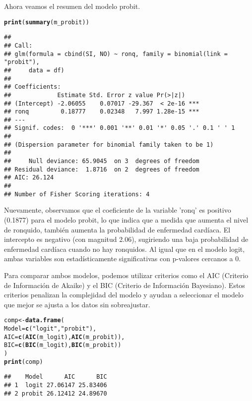 \documentclass[paper=letter, fontsize=11pt, draft=false]{scrartcl}\usepackage[]{graphicx}\usepackage[]{xcolor}
\makeatletter
\newcommand{\hlsng}[1]{\textcolor[rgb]{0.192,0.494,0.8}{#1}}%
\newcommand{\hldef}[1]{\textcolor[rgb]{0.345,0.345,0.345}{#1}}%
\newcommand{\hlkwb}[1]{\textcolor[rgb]{0.69,0.353,0.396}{#1}}%
\newcommand{\hlkwc}[1]{\textcolor[rgb]{0.333,0.667,0.333}{#1}}%
\newcommand{\hlkwd}[1]{\textcolor[rgb]{0.737,0.353,0.396}{\textbf{#1}}}%
\newenvironment{kframe}{%
 \def\at@end@of@kframe{}%
 \ifinner\ifhmode%
  \def\at@end@of@kframe{\end{minipage}}%
  \begin{minipage}{\columnwidth}%
 \fi\fi%
 \def\FrameCommand##1{\hskip\@totalleftmargin \hskip-\fboxsep
 \colorbox{shadecolor}{##1}\hskip-\fboxsep
     \hskip-\linewidth \hskip-\@totalleftmargin \hskip\columnwidth}%
 \MakeFramed {\advance\hsize-\width
   \@totalleftmargin\z@ \linewidth\hsize
   \@setminipage}}%
 {\par\unskip\endMakeFramed%
 \at@end@of@kframe}
\newenvironment{knitrout}{}{} %
\numberwithin{equation}{problemcounter} %
\numberwithin{figure}{problemcounter} %
\numberwithin{table}{problemcounter} %
\numberwithin{subsection}{problemcounter}
\makeatother
\begin{document}
Ahora veamos el resumen del modelo probit.

\begin{knitrout}
\color{fgcolor}\begin{kframe}
\begin{alltt}
\hlkwd{print}\hldef{(}\hlkwd{summary}\hldef{(m_probit))}
\end{alltt}
\begin{verbatim}
## 
## Call:
## glm(formula = cbind(SI, NO) ~ ronq, family = binomial(link = "probit"), 
##     data = df)
## 
## Coefficients:
##             Estimate Std. Error z value Pr(>|z|)    
## (Intercept) -2.06055    0.07017 -29.367  < 2e-16 ***
## ronq         0.18777    0.02348   7.997 1.28e-15 ***
## ---
## Signif. codes:  0 '***' 0.001 '**' 0.01 '*' 0.05 '.' 0.1 ' ' 1
## 
## (Dispersion parameter for binomial family taken to be 1)
## 
##     Null deviance: 65.9045  on 3  degrees of freedom
## Residual deviance:  1.8716  on 2  degrees of freedom
## AIC: 26.124
## 
## Number of Fisher Scoring iterations: 4
\end{verbatim}
\end{kframe}
\end{knitrout}

Nuevamente, observamos que el coeficiente de la variable 'ronq' es positivo (0.1877) para el modelo probit, lo que indica que a medida que aumenta el nivel de ronquido, también aumenta la probabilidad de enfermedad cardíaca. El intercepto es negativo (con magnitud 2.06), sugiriendo una baja probabilidad de enfermedad cardíaca cuando no hay ronquidos. Al igual que en el modelo logit, ambas variables son estadísticamente significativas con p-valores cercanos a 0. 

Para comparar ambos modelos, podemos utilizar criterios como el AIC (Criterio de Información de Akaike) y el BIC (Criterio de Información Bayesiano). Estos criterios penalizan la complejidad del modelo y ayudan a seleccionar el modelo que mejor se ajusta a los datos sin sobreajustar.

\begin{knitrout}
\color{fgcolor}\begin{kframe}
\begin{alltt}
\hldef{comp} \hlkwb{<-} \hlkwd{data.frame}\hldef{(}
    \hlkwc{Model} \hldef{=} \hlkwd{c}\hldef{(}\hlsng{"logit"}\hldef{,} \hlsng{"probit"}\hldef{),}
    \hlkwc{AIC} \hldef{=} \hlkwd{c}\hldef{(}\hlkwd{AIC}\hldef{(m_logit),} \hlkwd{AIC}\hldef{(m_probit)),}
    \hlkwc{BIC} \hldef{=} \hlkwd{c}\hldef{(}\hlkwd{BIC}\hldef{(m_logit),} \hlkwd{BIC}\hldef{(m_probit))}
\hldef{)}
\hlkwd{print}\hldef{(comp)}
\end{alltt}
\begin{verbatim}
##    Model      AIC      BIC
## 1  logit 27.06147 25.83406
## 2 probit 26.12412 24.89670
\end{verbatim}
\end{kframe}
\end{knitrout}
\end{document}
